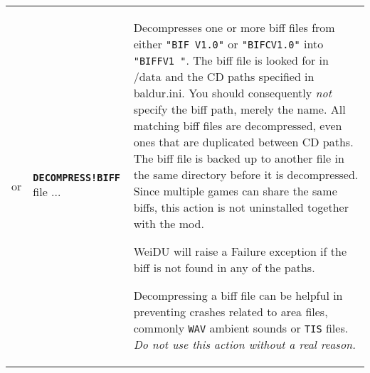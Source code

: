 \documentclass{article}
\def\DEFINE#1{{\tt \bf #1}\label{#1}\index{#1}}
\def\t#1{{\tt #1}}
\begin{document}
\begin{tabular}{cp{10in}|p{10in}}
or & \DEFINE{DECOMPRESS!BIFF} file ... &
  Decompresses one or more biff files from either \t{"BIF V1.0"} or \t{"BIFCV1.0"}
  into \t{"BIFFV1  "}.
  The biff file is looked for in /data and the CD paths specified in baldur.ini. You should
  consequently \emph{not} specify the biff path, merely the name. All matching biff files
  are decompressed, even ones that are duplicated between CD paths. The biff file is backed up
  to another file in the same directory before it is decompressed. Since multiple games
  can share the same biffs, this action is not uninstalled together with the mod.

  WeiDU will raise a Failure exception if the biff is not found in any of the paths.

  Decompressing a biff file can be helpful in preventing crashes related to area files,
  commonly \t{WAV} ambient sounds or \t{TIS} files. \emph{Do not use this action without a real reason.} \\


\end{tabular}
\end{document}
